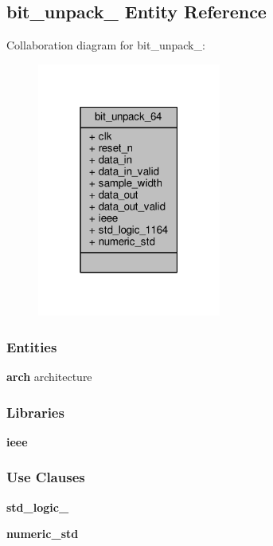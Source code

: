 \subsection{bit\+\_\+unpack\+\_ Entity Reference}
\label{classbit__unpack__64}


Collaboration diagram for bit\+\_\+unpack\+\_\+:\nopagebreak
\begin{figure}[H]
\begin{center}
\leavevmode
\includegraphics[width=171pt]{d8/d5d/classbit__unpack__64__coll__graph}
\end{center}
\end{figure}
\subsubsection*{Entities}
\begin{DoxyCompactItemize}
\item 
{\bf arch} architecture
\end{DoxyCompactItemize}
\subsubsection*{Libraries}
 \begin{DoxyCompactItemize}
\item 
{\bf ieee} 
\end{DoxyCompactItemize}
\subsubsection*{Use Clauses}
 \begin{DoxyCompactItemize}
\item 
{\bf std\+\_\+logic\+\_}   
\item 
{\bf numeric\+\_\+std}   
\end{DoxyCompactItemize}
